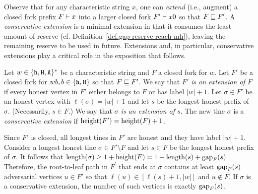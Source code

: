 Observe that for any characteristic string $x$, 
one can \emph{extend} (i.e., augment) a closed fork prefix $F \vdash x$ 
into a larger closed fork $F' \vdash x0$ so that $F \sqsubseteq F'$. 
A \emph{conservative extension} is a minimal extension in that 
it consumes the least amount of reserve (cf. Definition~\ref{def:gap-reserve-reach-mh}), 
leaving the remaining reserve to be used in future.
Extensions and, in particular, conservative extensions 
play a critical role in the exposition that follows. 

\begin{definition}[Extensions]\label{def:extension-mh}  
  Let $w \in \{\mathtt{h}, \mathtt{H}, \mathtt{A}\}^*$ be a characteristic string 
  and $F$ a closed fork for $w$. 
  Let $F'$ be a closed fork for $wb, b \in \{\mathtt{h}, \mathtt{H}\}$ 
  so that $F \sqsubseteq F'$. 
  We say that \emph{$F'$ is an extension of $F$} if 
  every honest vertex in $F'$ either belongs to $F$ or has label $|w| + 1$. 
  Let $\sigma \in F'$ be an honest vertex with $\ell(\sigma) = |w| + 1$ 
  and let $s$ be the longest honest prefix of $\sigma$. 
  (Necessarily, $s \in F$.)
  We say that \emph{$\sigma$ is an extension of $s$}. 
  The new tine $\sigma$ is a \emph{conservative extension} if 
  $\operatorname{height}(F') = \operatorname{height}(F) + 1$.  
\end{definition} 
Since $F'$ is closed, all longest tines in $F'$ are honest and they have label $|w| + 1$.
Consider a longest honest tine $\sigma \in F'\setminus F$ and 
let $s \in F$ be the longest honest prefix of $\sigma$.
It follows that 
$\operatorname{length}(\sigma) 
\geq 1 + \operatorname{height}(F) 
= 1 + \operatorname{length}(s) + \operatorname{gap}_F(s)$ 
Therefore, the root-to-leaf path in $F^\prime$ 
that ends at $\sigma$ 
contains at least $\operatorname{gap}_F(s)$ adversarial vertices $u \in F'$ 
so that $\ell(u) \in [\ell(s) + 1, |w|]$ and 
$u \not \in F$. 
If $\sigma$ is a conservative extension, 
the number of such vertices is exactly $\operatorname{gap}_F(s)$. 


